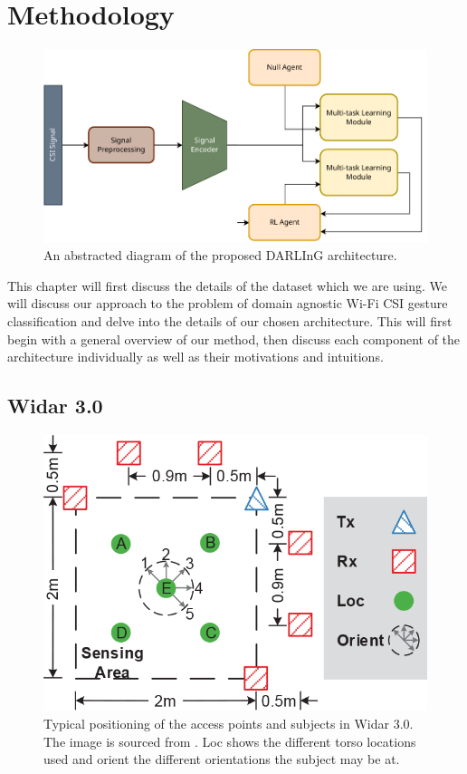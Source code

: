 \chapter{Methodology}\label{chapter:methodology}

\begin{figure}
	\centering
	\includegraphics[width=\linewidth]{figures/arch_diagram.pdf}
	\caption{An abstracted diagram of the proposed DARLInG architecture.}
	\label{fig:arch-diagram}
\end{figure}

This chapter will first discuss the details of the dataset which we are using. 
We will discuss our approach to the problem of domain agnostic Wi-Fi CSI gesture classification and delve into the details of our chosen architecture.
This will first begin with a general overview of our method, then discuss each component of the architecture individually as well as their motivations and intuitions.

\section{Widar 3.0}

\begin{figure}
	\centering
	\includegraphics{figures/widar-positioning}
	\caption{Typical positioning of the access points and subjects in Widar 3.0. The image is sourced from \cite{zheng2019zero}. Loc shows the different torso locations used and orient the different orientations the subject may be at.}
	\label{fig:widar-positioning}
\end{figure}

